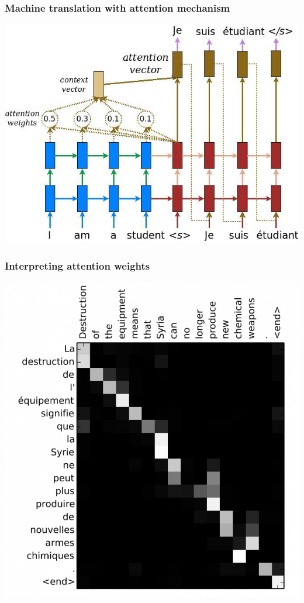 \documentclass[compress]{beamer}
\begin{document}
\begin{frame}
  \frametitle{Machine translation with attention mechanism}
  \begin{center}
    \includegraphics[scale=0.3]{translation_att.png}
  \end{center}
\end{frame}

\begin{frame}
  \frametitle{Interpreting attention weights}
  \begin{center}
    \includegraphics[scale=0.2]{att_w.png}
  \end{center}
\end{frame}
\end{document}
